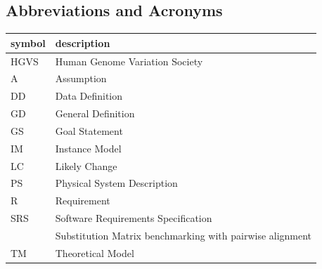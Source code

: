 \documentclass[12pt]{article}
\begin{document}
\subsection{Abbreviations and Acronyms}

\renewcommand{\arraystretch}{1.2}
\begin{tabular}{l l} 
  \toprule		
  \textbf{symbol} & \textbf{description}\\
  \midrule 
  HGVS & Human Genome Variation Society\\
  A & Assumption\\
  DD & Data Definition\\
  GD & General Definition\\
  GS & Goal Statement\\
  IM & Instance Model\\
  LC & Likely Change\\
  PS & Physical System Description\\
  R & Requirement\\
  SRS & Software Requirements Specification\\
  \progname{} & Substitution Matrix benchmarking with pairwise alignment\\
  TM & Theoretical Model\\
  \bottomrule
\end{tabular}\\




\end{document}
